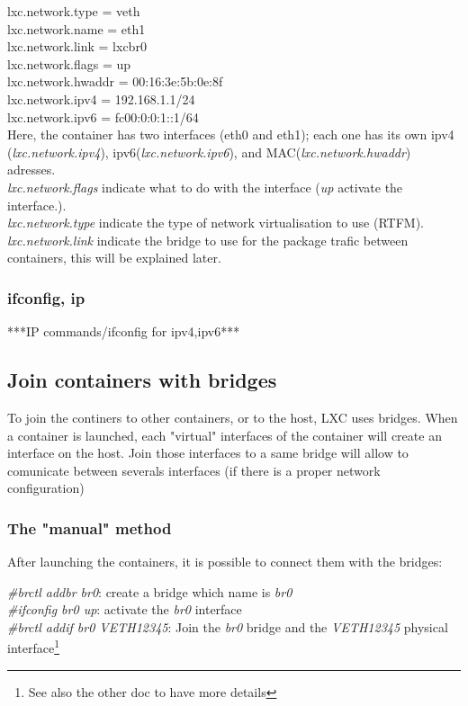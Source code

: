 \documentclass{article}
\begin{document}
\noindent
lxc.network.type = veth\\
lxc.network.name = eth1\\
lxc.network.link = lxcbr0\\
lxc.network.flags = up\\
lxc.network.hwaddr = 00:16:3e:5b:0e:8f\\
lxc.network.ipv4 = 192.168.1.1/24\\
lxc.network.ipv6 = fc00:0:0:1::1/64\\

Here, the container has two interfaces (eth0 and eth1); each one has its own ipv4 (\emph{lxc.network.ipv4}), ipv6(\emph{lxc.network.ipv6}),
and MAC(\emph{lxc.network.hwaddr}) adresses.\\
\emph{lxc.network.flags} indicate what to do with the interface (\emph{up} activate the interface.).\\
\emph{lxc.network.type} indicate the type of network virtualisation to use (RTFM).\\
\emph{lxc.network.link} indicate the bridge to use for the package trafic between containers, this will be explained later.\\

\subsubsection{ifconfig, ip}

***IP commands/ifconfig for ipv4,ipv6***

\subsection{Join containers with bridges}

To join the continers to other containers, or to the host, LXC uses bridges. When a container is launched,
each "virtual" interfaces of the container will create an interface on the host. Join those interfaces
to a same bridge will allow to comunicate between severals interfaces (if there is a proper network configuration)

\subsubsection{The "manual" method}

After launching the containers, it is possible to connect them with the bridges:

\noindent
\emph{\#brctl addbr br0}: create a bridge which name is \emph{br0}\\
\emph{\#ifconfig br0 up}: activate the \emph{br0} interface\\
\emph{\#brctl addif br0 VETH12345}: Join the \emph{br0} bridge and the \emph{VETH12345} physical interface\footnote{See also the other doc to have more details}\\
\end{document}
